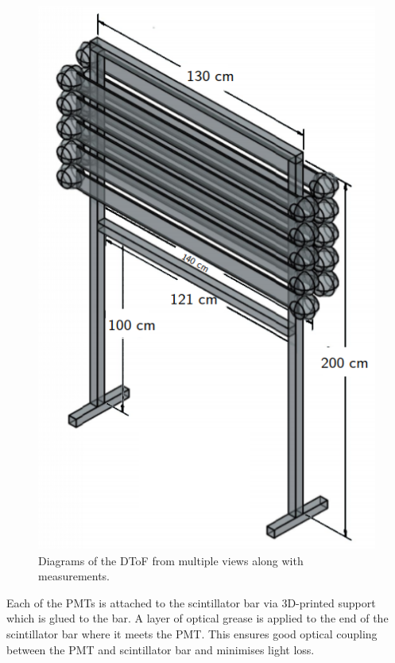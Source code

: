 \begin{figure}[h]
\begin{minipage}[t]{.4\linewidth}
    \includegraphics[width=\linewidth]{files/figures/hptpc_dtof_characterisation/dstofDiag}
  \end{minipage}
  \caption[Diagrams of the HPgTPC DToF]{Diagrams of the DToF from multiple views along with measurements.}
  \label{fig:dtofDiag}
\end{figure}

Each of the PMTs is attached to the scintillator bar via 3D-printed support which is glued to the bar.
A layer of optical grease is applied to the end of the scintillator bar where it meets the PMT.
This ensures good optical coupling between the PMT and scintillator bar and minimises light loss.

